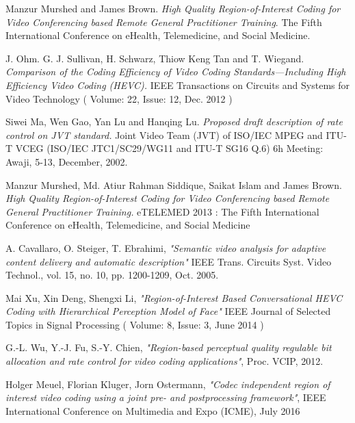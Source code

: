 \documentclass[11pt]{article} %
\begin{document}
	
%
%
%
%
%
\clearpage
\begin{thebibliography}{9}
Manzur Murshed and James Brown. 
\textit{High Quality Region-of-Interest Coding for Video Conferencing based Remote General Practitioner Training}. 
The Fifth International Conference on eHealth, Telemedicine, and Social Medicine.

J. Ohm. G. J. Sullivan, H. Schwarz, Thiow Keng Tan and T. Wiegand.
\textit{Comparison of the Coding Efficiency of Video Coding Standards—Including High Efficiency Video Coding (HEVC).}
 IEEE Transactions on Circuits and Systems for Video Technology ( Volume: 22, Issue: 12, Dec. 2012 )

Siwei Ma, Wen Gao, Yan Lu and Hanqing Lu.
\textit{Proposed draft description of rate control on JVT standard. }
Joint Video Team (JVT) of ISO/IEC MPEG and ITU-T VCEG (ISO/IEC JTC1/SC29/WG11 and ITU-T SG16 Q.6) 6h Meeting: Awaji, 5-13, December, 2002.

Manzur Murshed, Md. Atiur Rahman Siddique, Saikat Islam and James Brown.
\textit{High Quality Region-of-Interest Coding for Video Conferencing based Remote General Practitioner Training.}
eTELEMED 2013 : The Fifth International Conference on eHealth, Telemedicine, and Social Medicine

A. Cavallaro, O. Steiger, T. Ebrahimi, \textit{"Semantic video analysis for adaptive content delivery and automatic description"}
IEEE Trans. Circuits Syst. Video Technol., vol. 15, no. 10, pp. 1200-1209, Oct. 2005.

Mai Xu, Xin Deng, Shengxi Li, \textit{"Region-of-Interest Based Conversational HEVC Coding with Hierarchical Perception Model of Face"}
IEEE Journal of Selected Topics in Signal Processing ( Volume: 8, Issue: 3, June 2014 )

G.-L. Wu, Y.-J. Fu, S.-Y. Chien, \textit{"Region-based perceptual quality regulable bit allocation and rate control for video coding applications"},
Proc. VCIP, 2012.

Holger Meuel, Florian Kluger, Jorn Ostermann, \textit{"Codec independent region of interest video coding using a joint pre- and postprocessing framework"}, 
IEEE International Conference on Multimedia and Expo (ICME), July 2016


\end{thebibliography}
\end{document}
